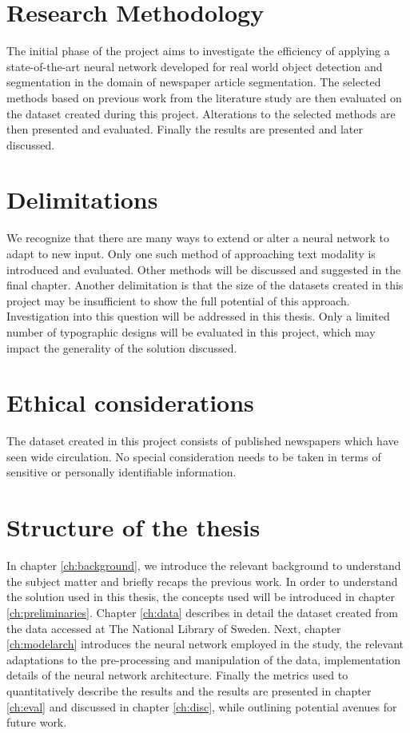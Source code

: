 \documentclass[english, bibtex]{kththesis}
\begin{document}
\section{Research Methodology}

The initial phase of the project aims to investigate the efficiency of applying a state-of-the-art neural network developed for real world object detection and segmentation in the domain of newspaper article segmentation. The selected methods based on previous work from the literature study are then evaluated on the dataset created during this project. Alterations to the selected methods are then presented and evaluated. Finally the results are presented and later discussed.

\section{Delimitations}

We recognize that there are many ways to extend or alter a neural network to adapt to new input. Only one such method of approaching text modality is introduced and evaluated. Other methods will be discussed and suggested in the final chapter. Another delimitation is that the size of the datasets created in this project may be insufficient to show the full potential of this approach. Investigation into this question will be addressed in this thesis. Only a limited number of typographic designs will be evaluated in this project, which may impact the generality of the solution discussed.

\section{Ethical considerations}

The dataset created in this project consists of published newspapers which have seen wide circulation. No special consideration needs to be taken in terms of sensitive or personally identifiable information.   

\section{Structure of the thesis}

In chapter \ref{ch:background}, we introduce the relevant background to understand the subject matter and briefly recaps the previous work. In order to understand the solution used in this thesis, the concepts used will be introduced in chapter \ref{ch:preliminaries}. Chapter \ref{ch:data} describes in detail the dataset created from the data accessed at The National Library of Sweden.  Next, chapter \ref{ch:modelarch} introduces the neural network employed in the study, the relevant adaptations to the pre-processing and manipulation of the data, implementation details of the neural network architecture. Finally the metrics used to quantitatively describe the results and the results are presented in chapter \ref{ch:eval} and discussed in chapter \ref{ch:disc}, while outlining potential avenues for future work.
\end{document}
